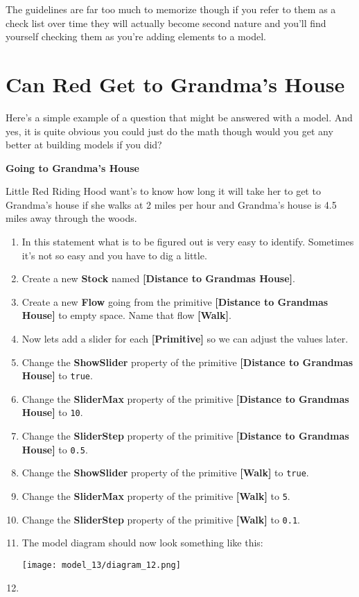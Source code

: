 \documentclass[]{memoir}
\makeatletter
\def\maxwidth{\ifdim\Gin@nat@width>\linewidth\linewidth
\else\Gin@nat@width\fi}
\let\Oldincludegraphics\includegraphics
\renewcommand{\includegraphics}[1]{\Oldincludegraphics[width=\maxwidth]{#1}}
\newcommand{\p}[1]{\textbf{{[}#1{]}}}
\newcommand{\e}[1]{\texttt{#1}}
\renewcommand{\a}[1]{\textbf{#1}}
\makeatother
\begin{document}
The guidelines are far too much to memorize though if you refer to them
as a check list over time they will actually become second nature and
you'll find yourself checking them as you're adding elements to a model.

\section{Can Red Get to Grandma's House}

Here's a simple example of a question that might be answered with a
model. And yes, it is quite obvious you could just do the math though
would you get any better at building models if you did?

\FloatBarrier 

\begin{oframed}\textbf{Going to Grandma's House} 

 Little Red Riding Hood want's to know how long it will take her to get to Grandma's house if she walks at 2 miles per hour and Grandma's house is 4.5 miles away through the woods.

\begin{enumerate}
\item 

In this statement what is to be figured out is very easy to identify. Sometimes it's not so easy and you have to dig a little.


\item Create a new \a{Stock} named \p{Distance to Grandmas House}.
\item Create a new \a{Flow} going from the primitive \p{Distance to Grandmas House} to empty space. Name that flow \p{Walk}.
\item 

Now lets add a slider for each \p{Primitive} so we can adjust the values later.


\item  Change the \a{ShowSlider} property of the primitive \p{Distance to Grandmas House} to \e{true}.
\item  Change the \a{SliderMax} property of the primitive \p{Distance to Grandmas House} to \e{10}.
\item  Change the \a{SliderStep} property of the primitive \p{Distance to Grandmas House} to \e{0.5}.
\item  Change the \a{ShowSlider} property of the primitive \p{Walk} to \e{true}.
\item  Change the \a{SliderMax} property of the primitive \p{Walk} to \e{5}.
\item  Change the \a{SliderStep} property of the primitive \p{Walk} to \e{0.1}.
\item The model diagram should now look something like this: \par \begin{minipage}{\linewidth}  \centering \texttt{[image: model\_13/diagram\_12.png]}
\end{minipage}
\item 


\end{enumerate}
\end{oframed}
\end{document}
